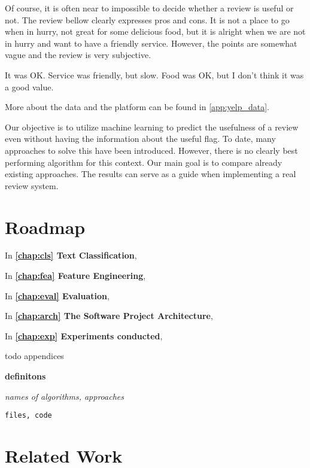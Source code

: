 Of course, it is often near to impossible to decide whether a review is useful or not.
The review bellow clearly expresses pros and cons.
It is not a place to go when in hurry, not great for some delicious food,
but it is alright when we are not in hurry and want to have a friendly service.
However, the points are somewhat vague and the review is very subjective.

\begin{code}
It was OK. Service was friendly, but slow.
Food was OK, but I don't think it was a good value.
\end{code}


More about the data and the platform can be found in \autoref{app:yelp_data}.

Our objective is to utilize machine learning to predict the usefulness of a review even without having the information about the useful flag.
To date, many approaches to solve this have been introduced.
However, there is no clearly best performing algorithm for this context.
Our main goal is to compare already existing approaches.
The results can serve as a guide when implementing a real review system.

\section{Roadmap}

In \textbf{\autoref{chap:cls} Text Classification},

In \textbf{\autoref{chap:fea} Feature Engineering},

In \textbf{\autoref{chap:eval} Evaluation},

In \textbf{\autoref{chap:arch} The Software Project Architecture},

In \textbf{\autoref{chap:exp} Experiments conducted},

todo appendices




{\bf definitons}

{\it names of algorithms, approaches}

\texttt{files, code}



\section{Related Work}

